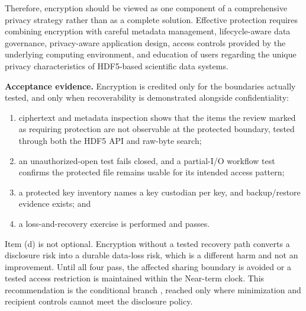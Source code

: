 \documentclass[../main.tex]{subfiles}
\begin{document}
Therefore, encryption should be viewed as one component of a comprehensive 
privacy strategy rather than as a complete solution. Effective protection 
requires combining encryption with careful metadata management, lifecycle-aware
data governance, privacy-aware application design, access controls provided by
the underlying computing environment, and education of users regarding the
unique privacy characteristics of HDF5-based scientific data systems.

\noindent\textbf{Acceptance evidence.}
Encryption is credited only for the boundaries actually tested, and only when
recoverability is demonstrated alongside confidentiality:

\begin{enumerate}[label=(\alph*),leftmargin=2em]
    \item ciphertext and metadata inspection shows that the items the
           review marked as requiring protection are not
          observable at the protected boundary, tested through both the HDF5
          API and raw-byte search;
    \item an unauthorized-open test fails closed, and a partial-I/O workflow
          test confirms the protected file remains usable for its intended
          access pattern;
    \item a protected key inventory names a key custodian per key, and
          backup/restore evidence exists; and
    \item a loss-and-recovery exercise is performed and passes.
\end{enumerate}

Item (d) is not optional. Encryption without a tested recovery path converts a
disclosure risk into a durable data-loss risk, which is a different harm and
not an improvement. Until all four pass, the affected sharing boundary is
avoided or a tested access restriction is maintained within the
 Near-term clock. This recommendation is the conditional
branch , reached only where  minimization and
recipient controls cannot meet the disclosure policy.
\end{document}

